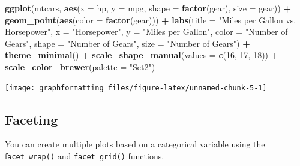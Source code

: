 \documentclass[
]{book}
\newenvironment{Shaded}{\begin{snugshade}}{\end{snugshade}}
\newcommand{\AttributeTok}[1]{\textcolor[rgb]{0.13,0.29,0.53}{#1}}
\newcommand{\DecValTok}[1]{\textcolor[rgb]{0.00,0.00,0.81}{#1}}
\newcommand{\FunctionTok}[1]{\textcolor[rgb]{0.13,0.29,0.53}{\textbf{#1}}}
\newcommand{\NormalTok}[1]{#1}
\newcommand{\SpecialCharTok}[1]{\textcolor[rgb]{0.81,0.36,0.00}{\textbf{#1}}}
\newcommand{\StringTok}[1]{\textcolor[rgb]{0.31,0.60,0.02}{#1}}
\begin{document}
\begin{Shaded}
\begin{Highlighting}[]
\FunctionTok{ggplot}\NormalTok{(mtcars, }\FunctionTok{aes}\NormalTok{(}\AttributeTok{x =}\NormalTok{ hp, }\AttributeTok{y =}\NormalTok{ mpg, }\AttributeTok{shape =} \FunctionTok{factor}\NormalTok{(gear), }\AttributeTok{size =}\NormalTok{ gear)) }\SpecialCharTok{+}
  \FunctionTok{geom\_point}\NormalTok{(}\FunctionTok{aes}\NormalTok{(}\AttributeTok{color =} \FunctionTok{factor}\NormalTok{(gear))) }\SpecialCharTok{+}
  \FunctionTok{labs}\NormalTok{(}\AttributeTok{title =} \StringTok{"Miles per Gallon vs. Horsepower"}\NormalTok{,}
       \AttributeTok{x =} \StringTok{"Horsepower"}\NormalTok{,}
       \AttributeTok{y =} \StringTok{"Miles per Gallon"}\NormalTok{,}
       \AttributeTok{color =} \StringTok{"Number of Gears"}\NormalTok{,}
       \AttributeTok{shape =} \StringTok{"Number of Gears"}\NormalTok{,}
       \AttributeTok{size =} \StringTok{"Number of Gears"}\NormalTok{) }\SpecialCharTok{+}
  \FunctionTok{theme\_minimal}\NormalTok{() }\SpecialCharTok{+}
  \FunctionTok{scale\_shape\_manual}\NormalTok{(}\AttributeTok{values =} \FunctionTok{c}\NormalTok{(}\DecValTok{16}\NormalTok{, }\DecValTok{17}\NormalTok{, }\DecValTok{18}\NormalTok{)) }\SpecialCharTok{+}
  \FunctionTok{scale\_color\_brewer}\NormalTok{(}\AttributeTok{palette =} \StringTok{"Set2"}\NormalTok{)}
\end{Highlighting}
\end{Shaded}

\texttt{[image: graphformatting\_files/figure-latex/unnamed-chunk-5-1]}

\hypertarget{faceting-1}{%
\subsection{Faceting}\label{faceting-1}}

You can create multiple plots based on a categorical variable using the f\texttt{acet\_wrap()} and \texttt{facet\_grid()} functions.
\end{document}
